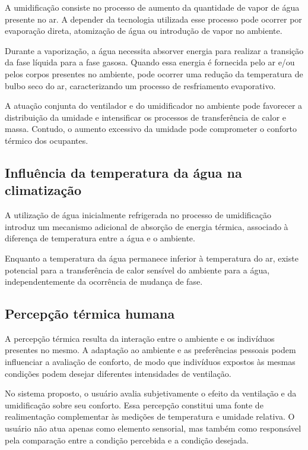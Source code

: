 \documentclass[conference]{IEEEtran}
\begin{document}
A umidificação consiste no processo de aumento da quantidade de vapor de água presente no ar. A depender da tecnologia utilizada esse processo pode ocorrer por evaporação direta, atomização de água ou introdução de vapor no ambiente.

Durante a vaporização, a água necessita absorver energia para realizar a transição da fase líquida para a fase gasosa. Quando essa energia é fornecida pelo ar e/ou pelos corpos presentes no ambiente, pode ocorrer uma redução da temperatura de bulbo seco do ar, caracterizando um processo de resfriamento evaporativo.

A atuação conjunta do ventilador e do umidificador no ambiente pode favorecer a distribuição da umidade e intensificar os processos de transferência de calor e massa. Contudo, o aumento excessivo da umidade pode comprometer o conforto térmico dos ocupantes.

\subsection{Influência da temperatura da água na climatização}

A utilização de água inicialmente refrigerada no processo de umidificação introduz um mecanismo adicional de absorção de energia térmica, associado à diferença de temperatura entre a água e o ambiente.

Enquanto a temperatura da água permanece inferior à temperatura do ar, existe potencial para a transferência de calor sensível do ambiente para a água, independentemente da ocorrência de mudança de fase.

\subsection{Percepção térmica humana}

A percepção térmica resulta da interação entre o ambiente e os indivíduos presentes no mesmo. A adaptação ao ambiente e as preferências pessoais podem influenciar a avaliação de conforto, de modo que indivíduos expostos às mesmas condições podem desejar diferentes intensidades de ventilação.

No sistema proposto, o usuário avalia subjetivamente o efeito da ventilação e da umidificação sobre seu conforto. Essa percepção constitui uma fonte de realimentação complementar às medições de temperatura e umidade relativa. O usuário não atua apenas como elemento sensorial, mas também como responsável pela comparação entre a condição percebida e a condição desejada.
\end{document}
